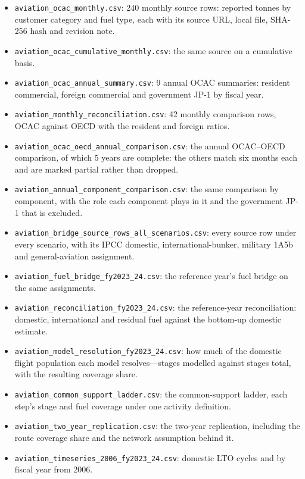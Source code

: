 \begin{itemize}\itemsep2pt
\item \texttt{aviation\_ocac\_monthly.csv}: \num{240} monthly source rows: reported tonnes by customer category and fuel type, each with its source URL, local file, SHA-256 hash and revision note.
\item \texttt{aviation\_ocac\_cumulative\_monthly.csv}: the same source on a cumulative basis.
\item \texttt{aviation\_ocac\_annual\_summary.csv}: \num{9} annual OCAC summaries: resident commercial, foreign commercial and government JP-1 by fiscal year.
\item \texttt{aviation\_monthly\_reconciliation.csv}: \num{42} monthly comparison rows, OCAC against OECD \COtwo{} with the resident and foreign ratios.
\item \texttt{aviation\_ocac\_oecd\_annual\_comparison.csv}: the annual OCAC--OECD comparison, of which \num{5} years are complete: the others match six months each and are marked partial rather than dropped.
\item \texttt{aviation\_annual\_component\_comparison.csv}: the same comparison by component, with the role each component plays in it and the government JP-1 that is excluded.
\item \texttt{aviation\_\allowbreak bridge\_\allowbreak source\_\allowbreak rows\_\allowbreak all\_\allowbreak scenarios.csv}: every source row under every scenario, with its IPCC domestic, international-bunker, military 1A5b and general-aviation assignment.
\item \texttt{aviation\_fuel\_bridge\_fy2023\_24.csv}: the reference year's fuel bridge on the same assignments.
\item \texttt{aviation\_reconciliation\_fy2023\_24.csv}: the reference-year reconciliation: domestic, international and residual fuel against the bottom-up domestic estimate.
\item \texttt{aviation\_model\_resolution\_fy2023\_24.csv}: how much of the domestic flight population each model resolves---stages modelled against stages total, with the resulting coverage share.
\item \texttt{aviation\_common\_support\_ladder.csv}: the common-support ladder, each step's stage and fuel coverage under one activity definition.
\item \texttt{aviation\_two\_year\_replication.csv}: the two-year replication, including the route coverage share and the network assumption behind it.
\item \texttt{aviation\_timeseries\_2006\_fy2023\_24.csv}: domestic LTO cycles and \COe{} by fiscal year from 2006.

\end{itemize}
